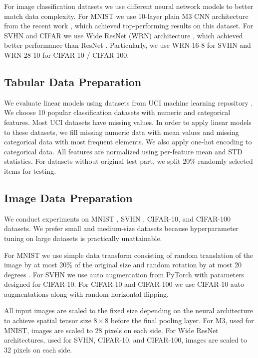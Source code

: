 \documentclass[nohyperref]{article}
\theoremstyle{plain}
\theoremstyle{definition}
\theoremstyle{remark}
\begin{document}
For image classification datasets we use different neural network models to better match data complexity. For MNIST we use 10-layer plain M3 CNN architecture from the recent work \cite{an2020simplecnn}, which achieved top-performing results on this dataset. For SVHN and CIFAR we use Wide ResNet (WRN) architecture \cite{zagoruyko2016wide}, which achieved better performance than ResNet \cite{he2016deep}. Particularly, we use WRN-16-8 for SVHN and WRN-28-10 for CIFAR-10 / CIFAR-100.

\subsection{Tabular Data Preparation}
We evaluate linear models using datasets from UCI machine learning repository \cite{Dua:2019}. We choose 10 popular classification datasets with numeric and categorical features. Most UCI datasets have missing values. In order to apply linear models to these datasets, we fill missing numeric data with mean values and missing categorical data with most frequent elements. We also apply one-hot encoding to categorical data. All features are normalized using per-feature mean and STD statistics. For datasets without original test part, we split 20\% randomly selected items for testing.

\subsection{Image Data Preparation}
We conduct experiments on MNIST \cite{lecun1998mnist}, SVHN \cite{netzer2011svhn}, CIFAR-10, and CIFAR-100 \cite{krizhevsky2009cifar} datasets. We prefer small and medium-size datasets because hyperparameter tuning on large datasets is practically unattainable.

For MNIST we use simple data transform consisting of random translation of the image by at most 20\% of the original size and random rotation by at most 20 degrees \cite{an2020simplecnn}. For SVHN we use auto augmentation \cite{cubuk2019autoaugment} from PyTorch \cite{NEURIPS2019_9015} with parameters designed for CIFAR-10. For CIFAR-10 and CIFAR-100 we use CIFAR-10 auto augmentations along with random horizontal flipping.

All input images are scaled to the fixed size depending on the neural architecture to achieve spatial tensor size \mbox{$8 \times 8$} before the final pooling layer. For M3, used for MNIST, images are scaled to 28 pixels on each side. For Wide ResNet architectures, used for SVHN, CIFAR-10, and CIFAR-100, images are scaled to 32 pixels on each side.
\end{document}
